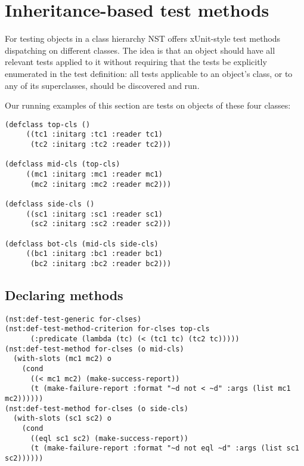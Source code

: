 
\section{Inheritance-based test methods}
\label{sec:methods}
For testing objects in a class hierarchy NST offers xUnit-style test
methods dispatching on different classes.  The idea is that an object
should have all relevant tests applied to it without requiring that
the tests be explicitly enumerated in the test definition: all tests
applicable to an object's class, or to any of its superclasses, should
be discovered and run.

Our running examples of this section are tests on objects of these
four classes:
\begin{verbatim}
(defclass top-cls ()
     ((tc1 :initarg :tc1 :reader tc1)
      (tc2 :initarg :tc2 :reader tc2)))

(defclass mid-cls (top-cls)
     ((mc1 :initarg :mc1 :reader mc1)
      (mc2 :initarg :mc2 :reader mc2)))

(defclass side-cls ()
     ((sc1 :initarg :sc1 :reader sc1)
      (sc2 :initarg :sc2 :reader sc2)))

(defclass bot-cls (mid-cls side-cls)
     ((bc1 :initarg :bc1 :reader bc1)
      (bc2 :initarg :bc2 :reader bc2)))
\end{verbatim}

\subsection{Declaring methods}

\begin{verbatim}
(nst:def-test-generic for-clses)
(nst:def-test-method-criterion for-clses top-cls
      (:predicate (lambda (tc) (< (tc1 tc) (tc2 tc)))))
(nst:def-test-method for-clses (o mid-cls)
  (with-slots (mc1 mc2) o
    (cond
      ((< mc1 mc2) (make-success-report))
      (t (make-failure-report :format "~d not < ~d" :args (list mc1 mc2))))))
(nst:def-test-method for-clses (o side-cls)
  (with-slots (sc1 sc2) o
    (cond
      ((eql sc1 sc2) (make-success-report))
      (t (make-failure-report :format "~d not eql ~d" :args (list sc1 sc2))))))
\end{verbatim}

